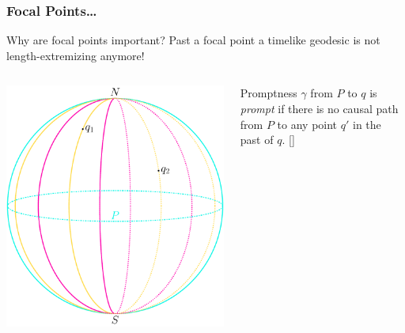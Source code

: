 \documentclass[]{beamer}
\begin{document}
	\begin{frame}
		\frametitle{Focal Points\ldots}
		\begin{ideablock}{Why are focal points important?}
			\centering
			Past a focal point a timelike geodesic is not length-extremizing anymore!
		\end{ideablock}
		\begin{columns}
			\centering
			\includegraphics[scale=0.33]{Immagini/sphere-focal-points/sphere-focal-points.pdf}
			\begin{defblock}{Promptness}
				\(\gamma\) from \(P\) to \(q\) is \emph{prompt} if there is no causal path from \(P\) to any point \(q'\) in the past of \(q\). [\cite[]{witten2020light}]
			\end{defblock}
		\end{columns}
	\end{frame}
\end{document}
